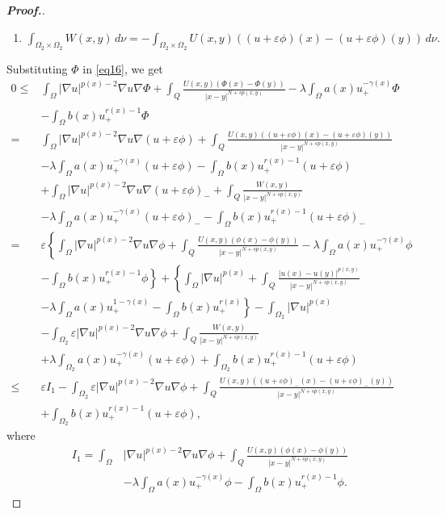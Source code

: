 \documentclass[10pt,a4paper]{amsart}
\newcommand{\Q}{\textit{Q}}
\newcommand{\ds} {\displaystyle}
\newcommand{\ga} {\gamma}
\newcommand{\grad}{\nabla}
\newcommand{\la} {\lambda}
\newcommand{\na} {\nabla}
\newcommand{\om} {\Omega}
\newcommand{\ve}{\varepsilon}
\begin{document}
\begin{proof}[\bf Proof.]
\begin{enumerate}
\item[(vii)]$\ds 
\int_{\om_2\times\om_2}W(x,y)\,d\nu=-
\int_{\om_2\times\om_2}U(x,y)((u+\ve\phi)(x)
-(u+\ve\phi)(y)) \,d\nu.$
\end{enumerate}
Substituting $\Phi$
in \eqref{eq16}, we get
\begin{align*}
    0\le&
\int_\om|\grad u|^{p(x)-2}\na u\na\Phi+
\int_{\Q} 
\frac{U(x,y)(\Phi(x)
-\Phi(y))}{|x-y|^{N+sp(x,y)}}\nonumber -\la
\int_\om a(x)u_+^{-\ga(x)}\Phi \\
&-\int_\om b(x)u_+^{r(x)-1}\Phi\\
    =&
\int_\om|\grad u|^{p(x)-2}\na u\na(u+\ve\phi)+
\int_{\Q} 
\frac{U(x,y)((u+\ve\phi)(x)-
(u+\ve\phi)(y))}{|x-y|^{N+sp(x,y)}}\\
    &-\la
\int_\om a(x)u_+^{-\ga(x)}(u+\ve\phi) -
\int_\om b(x)u_+^{r(x)-1}(u+\ve\phi) \\
 &+
\int_\om|\grad u|^{p(x)-2}\na u\na(u+\ve\phi)_- 
+
\int_{\Q} 
\frac{W(x,y)}
{|x-y|^{N+sp(x,y)}} \\
&   -\la
\int_\om a(x)u_+^{-\ga(x)}(u+\ve\phi)_- -
\int_\om b(x)u_+^{r(x)-1}(u+\ve\phi)_-\\
    =&\ve \left\{
\int_\om|\grad u|^{p(x)-2}\na u\na\phi+
\int_{\Q} 
\frac{U(x,y)(\phi(x)-\phi(y))}{|x-y|^{N+sp(x,y)}}-\la
\int_\om a(x)u_+^{-\ga(x)}\phi \right. \\
& \left. -
\int_\om b(x)u_+^{r(x)-1}\phi\right\} +
\left\{ \int_\om|\grad u|^{p(x)}+
\int_{\Q} 
\frac{|u(x)-u(y)|^{p(x,y)}}{|x-y|^{N+sp(x,y)}} \right.\\
& \left. -\la
\int_\om a(x)u_+^{1-\ga(x)}-
\int_\om b(x)u_+^{r(x)} \right\} -
\int_{\om_2}|\grad u|^{p(x)}\\
    &-
\int_{\om_2}\ve|\na u|^{p(x)-2}\na u\na \phi+
\int_{\Q} 
\frac{W(x,y)}{|x-y|^{N+sp(x,y)}}\\
    &+\la
\int_{\om_2} a(x)u_+^{-\ga(x)}(u+\ve\phi)+
\int_{\om_2} b(x)u_+^{r(x)-1}(u+\ve\phi)\\
    \le& \ve I_1-
\int_{\om_2}\ve|\na u|^{p(x)-2}\na u\na \phi+
\int_{\Q} 
\frac{U(x,y)((u+\ve\phi)_-(x)-(u+\ve\phi)_-(y))}
{|x-y|^{N+sp(x,y)}}\\
    &+
\int_{\om_2} b(x)u_+^{r(x)-1}(u+\ve\phi),
\end{align*}
where 
\begin{equation*}
\begin{aligned}
I_1 =
\int_\om&|\grad u|^{p(x)-2}\na u\na\phi+
\int_{\Q} 
\frac{U(x,y)(\phi(x)-\phi(y))}{|x-y|^{N+sp(x,y)}} \\
&-\la
\int_\om a(x)u_+^{-\ga(x)}\phi -
\int_\om b(x)u_+^{r(x)-1}\phi.
\end{aligned}
\end{equation*}



\end{proof}
\end{document}
